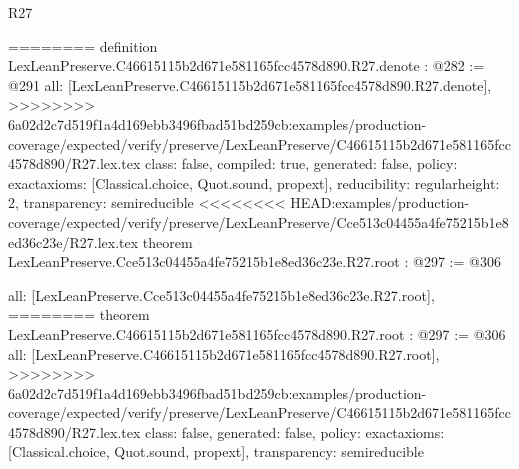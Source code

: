 \begin{lexlean}{R27}
\begin{coremodule}
{{{{========
definition LexLeanPreserve.C46615115b2d671e581165fcc4578d890.R27.denote : @282 := @291 {
  all: [LexLeanPreserve.C46615115b2d671e581165fcc4578d890.R27.denote],
>>>>>>>> 6a02d2c7d519f1a4d169ebb3496fbad51bd259cb:examples/production-coverage/expected/verify/preserve/LexLeanPreserve/C46615115b2d671e581165fcc4578d890/R27.lex.tex
  class: false,
  compiled: true,
  generated: false,
  policy: exact{axioms: [Classical.choice, Quot.sound, propext]},
  reducibility: regular{height: 2},
  transparency: semireducible
}
<<<<<<<< HEAD:examples/production-coverage/expected/verify/preserve/LexLeanPreserve/Cce513c04455a4fe75215b1e8ed36c23e/R27.lex.tex
theorem LexLeanPreserve.Cce513c04455a4fe75215b1e8ed36c23e.R27.root : @297 := @306 {
  all: [LexLeanPreserve.Cce513c04455a4fe75215b1e8ed36c23e.R27.root],
========
theorem LexLeanPreserve.C46615115b2d671e581165fcc4578d890.R27.root : @297 := @306 {
  all: [LexLeanPreserve.C46615115b2d671e581165fcc4578d890.R27.root],
>>>>>>>> 6a02d2c7d519f1a4d169ebb3496fbad51bd259cb:examples/production-coverage/expected/verify/preserve/LexLeanPreserve/C46615115b2d671e581165fcc4578d890/R27.lex.tex
  class: false,
  generated: false,
  policy: exact{axioms: [Classical.choice, Quot.sound, propext]},
  transparency: semireducible
}

}}}}}
\end{coremodule}
\end{lexlean}
